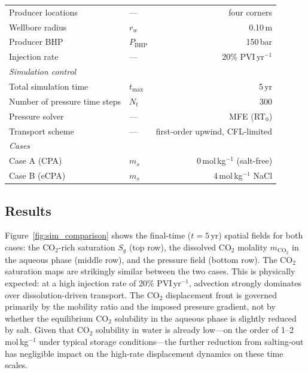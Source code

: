 \documentclass[preprint,12pt,number]{elsarticle}
\begin{document}
\begin{table}[H]
\begin{tabular}{llr}
    Producer locations                 & ---              & four corners \\
    Wellbore radius                    & $r_w$            & 0.10\,m \\
    Producer BHP                       & $P_\mathrm{BHP}$ & 150\,bar \\
    Injection rate                     & ---              & 20\% PVI\,yr$^{-1}$ \\
    \midrule
    \multicolumn{3}{l}{\textit{Simulation control}} \\
    Total simulation time              & $t_\mathrm{max}$ & 5\,yr \\
    Number of pressure time steps      & $N_t$            & 300 \\
    Pressure solver                    & ---              & MFE (RT$_0$) \\
    Transport scheme                   & ---              & first-order upwind, CFL-limited \\
    \midrule
    \multicolumn{3}{l}{\textit{Cases}} \\
    Case A (CPA)                       & $m_s$            & $0$\,mol\,kg$^{-1}$ (salt-free) \\
    Case B (eCPA)                      & $m_s$            & $4$\,mol\,kg$^{-1}$ NaCl \\
    \bottomrule
  \end{tabular}
\end{table}

\subsection*{Results}

Figure~\ref{fig:sim_comparison} shows the final-time ($t = 5$\,yr) spatial fields for
both cases: the CO$_2$-rich saturation $S_g$ (top row), the dissolved CO$_2$ molality
$m_{\text{CO}_2}$ in the aqueous phase (middle row), and the pressure field (bottom row).
The CO$_2$ saturation maps are strikingly similar between the two cases.
This is physically expected: at a high injection rate of 20\% PVI\,yr$^{-1}$, advection
strongly dominates over dissolution-driven transport.
The CO$_2$ displacement front is governed primarily by the mobility ratio and the
imposed pressure gradient, not by whether the equilibrium CO$_2$ solubility in the
aqueous phase is slightly reduced by salt.
Given that CO$_2$ solubility in water is already low---on the order of
1--2\,mol\,kg$^{-1}$ under typical storage conditions---the further reduction from
salting-out has negligible impact on the high-rate displacement dynamics on these
time scales.
\end{document}

